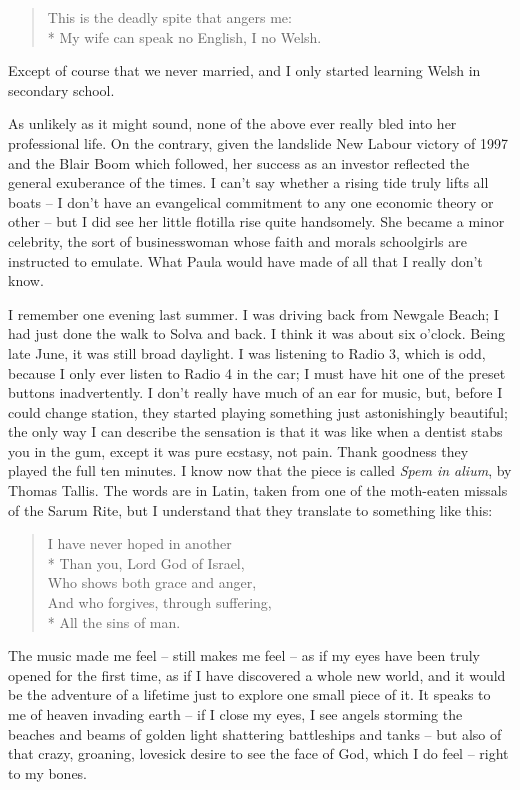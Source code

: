 \begin{quoting}
    \begin{verse}
        This is the deadly spite that angers me:\\*
        My wife can speak no English, I no Welsh.
    \end{verse}
\end{quoting}

Except of course that we never married, and I only started learning Welsh in secondary school.

As unlikely as it might sound, none of the above ever really bled into her professional life. On the contrary, given the landslide New Labour victory of 1997 and the Blair Boom which followed, her success as an investor reflected the general exuberance of the times. I can't say whether a rising tide truly lifts all boats -- I don't have an evangelical commitment to any one economic theory or other -- but I did see her little flotilla rise quite handsomely. She became a minor celebrity, the sort of businesswoman whose faith and morals schoolgirls are instructed to emulate. What Paula would have made of all that I really don't know.

I remember one evening last summer. I was driving back from Newgale Beach; I had just done the walk to Solva and back. I think it was about six o'clock. Being late June, it was still broad daylight. I was listening to Radio 3, which is odd, because I only ever listen to Radio 4 in the car; I must have hit one of the preset buttons inadvertently. I don't really have much of an ear for music, but, before I could change station, they started playing something just astonishingly beautiful; the only way I can describe the sensation is that it was like when a dentist stabs you in the gum, except it was pure ecstasy, not pain. Thank goodness they played the full ten minutes. I know now that the piece is called \textit{Spem in alium}, by Thomas Tallis. The words are in Latin, taken from one of the moth-eaten missals of the Sarum Rite, but I understand that they translate to something like this:

\begin{quoting}
    \begin{verse}
        I have never hoped in another\\*
        Than you, Lord God of Israel,\\
        Who shows both grace and anger,\\
        And who forgives, through suffering,\\*
        All the sins of man.
    \end{verse}
\end{quoting}

The music made me feel -- still makes me feel -- as if my eyes have been truly opened for the first time, as if I have discovered a whole new world, and it would be the adventure of a lifetime just to explore one small piece of it. It speaks to me of heaven invading earth -- if I close my eyes, I see angels storming the beaches and beams of golden light shattering battleships and tanks -- but also of that crazy, groaning, lovesick desire to see the face of God, which I do feel -- right to my bones.
